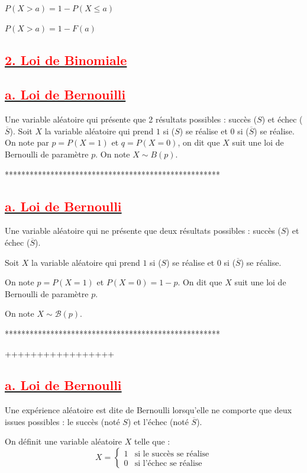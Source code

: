 \documentclass[12pt,a4paper]{article}
\begin{document}
$P(X > a) = 1 - P(X \leq a)$

$P(X > a) = 1 - F(a)$

\subsection*{\underline{\textbf{\textcolor{red}{2. Loi de Binomiale}}}}

\subsection*{\underline{\textbf{\textcolor{red}{a. Loi de Bernouilli}}}}

Une variable aléatoire qui présente que 2 résultats possibles : succès (\(S\)) et échec (\(\overline{S}\)). 
Soit \(X\) la variable aléatoire qui prend \(1\) si (\(S\)) se réalise et \(0\) si (\(\overline{S}\)) se réalise.
On note par \(p = P(X = 1)\) et \(q = P(X = 0)\), on dit que \(X\) suit une loi de Bernoulli de paramètre \(p\).
On note \(X \sim B(p)\).

****************************************************

\subsection*{\underline{\textbf{\textcolor{red}{a. Loi de Bernoulli}}}}

Une variable aléatoire qui ne présente que deux résultats possibles : succès (\(S\)) et échec (\(\overline{S}\)). 

Soit \(X\) la variable aléatoire qui prend \(1\) si (\(S\)) se réalise et \(0\) si (\(\overline{S}\)) se réalise.

On note \(p = P(X = 1)\) et \(P(X = 0) = 1 - p\). On dit que \(X\) suit une loi de Bernoulli de paramètre \(p\).

On note \(X \sim \mathcal{B}(p)\).

****************************************************

+++++++++++++++++
\subsection*{\underline{\textbf{\textcolor{red}{a. Loi de Bernoulli}}}}

Une expérience aléatoire est dite de Bernoulli lorsqu’elle ne comporte que deux issues possibles : 
le succès (noté \(S\)) et l’échec (noté \(\overline{S}\)).

On définit une variable aléatoire \(X\) telle que :
\[
X =
\begin{cases}
1 & \text{si le succès se réalise} \\
0 & \text{si l’échec se réalise}
\end{cases}
\]
\end{document}
